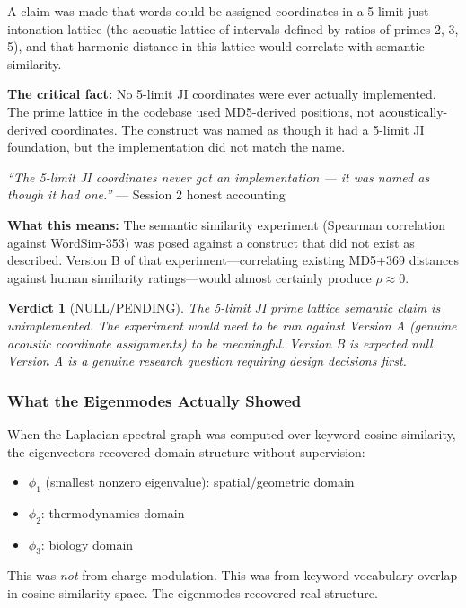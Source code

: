 \documentclass[11pt]{article}
\newtheorem{verdict}{Verdict}
\begin{document}
A claim was made that words could be assigned coordinates in a 5-limit just intonation lattice (the acoustic lattice of intervals defined by ratios of primes 2, 3, 5), and that harmonic distance in this lattice would correlate with semantic similarity.

\textbf{The critical fact:} No 5-limit JI coordinates were ever actually implemented. The prime lattice in the codebase used MD5-derived positions, not acoustically-derived coordinates. The construct was named as though it had a 5-limit JI foundation, but the implementation did not match the name.

\begin{graybox}
\textit{``The 5-limit JI coordinates never got an implementation --- it was named as though it had one.''} --- Session 2 honest accounting
\end{graybox}

\textbf{What this means:} The semantic similarity experiment (Spearman correlation against WordSim-353) was posed against a construct that did not exist as described. Version B of that experiment---correlating existing MD5+369 distances against human similarity ratings---would almost certainly produce $\rho \approx 0$.

\begin{verdict}[\textcolor{nullred}{NULL/PENDING}]
The 5-limit JI prime lattice semantic claim is unimplemented. The experiment would need to be run against Version A (genuine acoustic coordinate assignments) to be meaningful. Version B is expected null. Version A is a genuine research question requiring design decisions first.
\end{verdict}

\subsubsection{What the Eigenmodes Actually Showed}

When the Laplacian spectral graph was computed over keyword cosine similarity, the eigenvectors recovered domain structure without supervision:
\begin{itemize}
  \item $\phi_1$ (smallest nonzero eigenvalue): spatial/geometric domain
  \item $\phi_2$: thermodynamics domain
  \item $\phi_3$: biology domain
\end{itemize}

This was \textit{not} from charge modulation. This was from keyword vocabulary overlap in cosine similarity space. The eigenmodes recovered real structure.
\end{document}
